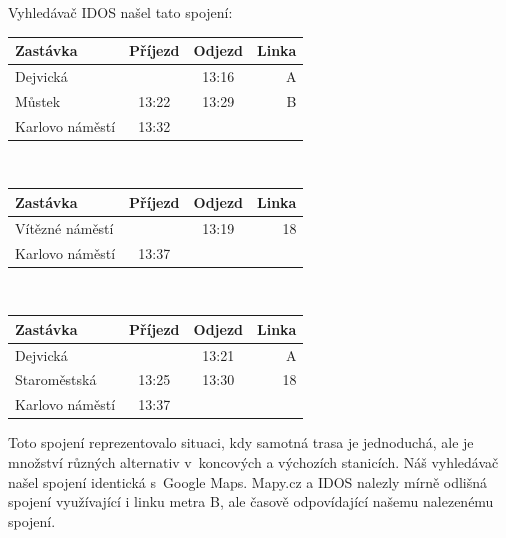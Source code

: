 Vyhledávač IDOS našel tato spojení:\\[2mm]
\begin{tabular}{|l|c|c|r|}\hline
{\bf Zastávka}&{\bf Příjezd}&{\bf Odjezd}&{\bf Linka}\\\hline
Dejvická&&13:16&A\\\hline
Můstek&13:22&13:29&B\\\hline
Karlovo náměstí&13:32&&\\\hline
\end{tabular}\\[2mm]
\begin{tabular}{|l|c|c|r|}\hline
{\bf Zastávka}&{\bf Příjezd}&{\bf Odjezd}&{\bf Linka}\\\hline
Vítězné náměstí&&13:19&18\\\hline
Karlovo náměstí&13:37&&\\\hline
\end{tabular}\\[2mm]
\begin{tabular}{|l|c|c|r|}\hline
{\bf Zastávka}&{\bf Příjezd}&{\bf Odjezd}&{\bf Linka}\\\hline
Dejvická&&13:21&A\\\hline
Staroměstská&13:25&13:30&18\\\hline
Karlovo náměstí&13:37&&\\\hline
\end{tabular} 

Toto spojení reprezentovalo situaci, kdy samotná trasa je jednoduchá, ale je
množství různých alternativ v~koncových a výchozích stanicích. Náš vyhledávač
našel spojení identická s~Google Maps. Mapy.cz a IDOS nalezly mírně odlišná
spojení využívající i linku metra B, ale časově odpovídající našemu nalezenému
spojení. 

